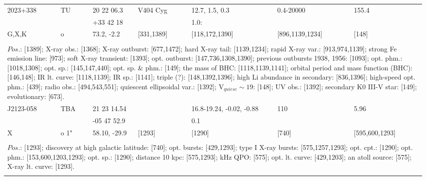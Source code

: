 \documentclass{aa}
\begin{document}
\begin{tabular}{p{2.5cm}p{1cm}p{1.8cm}p{2.3cm}p{3.3cm}p{2.0cm}p{2.2cm}}
\noalign{\smallskip}
2023+338   & TU                 & 20 22 06.3            & V404 Cyg       & 12.7, 1.5, 0.3            & 0.4-20000               & 155.4 \\
                     &                        & +33 42 18             &                          & 1.0:                            &                                  &      \\
G,X,K          & o                     & 73.2, -2.2              & [331,1389]      & [118,172,1390]        & [896,1139,1234]    & [148]  \\
\\ 
\multicolumn{7}{p{17.5cm}}{
$Pos$.: [1389]; X-ray obs.: [1368]; X-ray outburst: [677,1472]; hard X-ray tail: [1139,1234]; rapid X-ray var.: [913,974,1139]; 
strong Fe emission line: [973]; soft X-ray transient: [1393]; opt. outburst: 
[147,736,1308,1390]; previous outbursts 1938, 1956: [1093]; opt. phm.: [1018,1308]; opt. sp.: [145,147,440]; 
opt. sp. \& phm.: [149]; the mass of BHC: [1118,1139,1141]; 
orbital period and mass function (BHC): [146,148]; IR lt. curve: [1118,1139]; IR sp.: [1141]; triple (?): [148,1392,1396]; 
high Li abundance in secondary: [836,1396]; 
high-speed opt. phm.: [439]; radio obs.: [494,543,551]; quiescent ellipsoidal var.: [1392]; V$_{quiesc} \sim 19$: 
[148]; UV obs.: [1392]; secondary K0 III-V star: [149]; evolutionary: [673].}\\
\noalign{\smallskip}
\hline

\noalign{\smallskip}
J2123-058     & TBA      & 21 23 14.54   &                         & 16.8-19.24, -0.02, -0.88   & 110                & 5.96     \\
                         &               & -05 47 52.9    &                         & 0.1                                       &                       &    \\
X                      & o 1"       & 58.10, -29.9    & [1293]            & [1290]                                 & [740]             & [595,600,1293]   \\
\\
\multicolumn{7}{p{17.5cm}}{
$Pos$.: [1293]; discovery at high galactic latitude: [740]; opt. bursts: [429,1293]; type I X-ray bursts: 
[575,1257,1293]; opt. cpt.: [1290]; opt. phm.: [153,600,1203,1293]; opt. sp.: [1290]; distance 10 kpc: 
[575,1293]; kHz QPO: [575]; opt. lt. curve: [429,1203]; an atoll source: [575]; X-ray lt. curve: [1293].}\\
\noalign{\smallskip}
\hline


\end{tabular}
\end{document}
